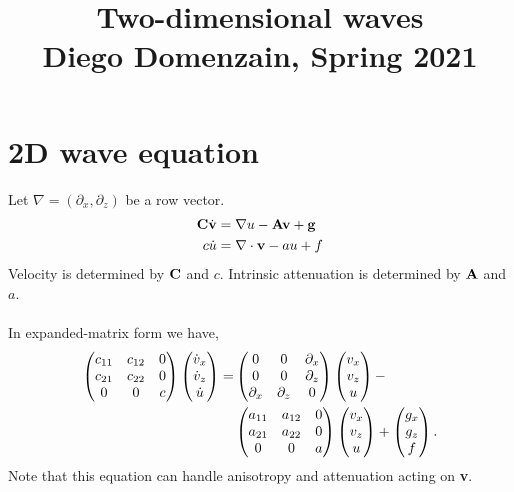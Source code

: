 \documentclass[a4paper,12pt]{article}
\title{Two-dimensional waves\\{\normalsize Diego Domenzain, Spring 2021}}
\author{}
\date{}
\begin{document}
\maketitle
\section*{2D wave equation}
Let $\nabla=(\partial_x,\partial_z)$ be a row vector.
\begin{align}
{\bf C}\dot{{\bf v}} &= \nabla u - {\bf A}{\bf v} + {\bf g}\\
c\dot{u} &= \nabla\cdot{\bf v} - a u + f
\end{align}
Velocity is determined by ${\bf C}$ and $c$. Intrinsic attenuation is determined by ${\bf A}$ and $a$.
\\\\
%
In expanded-matrix form we have,
\begin{align}
\begin{pmatrix} 
c_{11} & c_{12} & 0\cr 
c_{21} & c_{22} & 0 \cr
0 & 0 & c
\end{pmatrix}
%
\begin{pmatrix} 
\dot{v}_x \cr
\dot{v}_z \cr
\dot{u}
\end{pmatrix}
%
=
%
&
\begin{pmatrix} 
0 & 0 & \partial_x \cr 
0 & 0 & \partial_z \cr
\partial_x & \partial_z & 0
\end{pmatrix}
%
\begin{pmatrix} 
v_x \cr
v_z \cr
u
\end{pmatrix}
%
%
-\\
%
&
\begin{pmatrix} 
a_{11} & a_{12} & 0\cr 
a_{21} & a_{22} & 0 \cr
0 & 0 & a
\end{pmatrix}
%
\begin{pmatrix} 
v_x \cr
v_z \cr
u
\end{pmatrix}
%
+
%
\begin{pmatrix} 
g_x \cr
g_z \cr
f
\end{pmatrix}.
\end{align}
Note that this equation can handle anisotropy and attenuation acting on {\bf v}.
\clearpage
\end{document}
